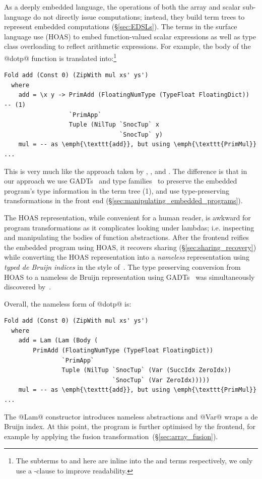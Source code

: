 As a deeply embedded language, the operations of both the array and scalar
sub-language do not directly issue computations; instead, they build term trees
to represent embedded computations (\S\ref{sec:EDSLs}). The terms in the surface
language use  (HOAS) to embed
function-valued scalar expressions as well as type class overloading to reflect
arithmetic expressions. For example, the body of the @dotp@ function
is translated into:\footnote{The subterms to  and 
here are inline into the  and  terms respectively,
we only use a -clause to improve readability.}
%
\begin{lstlisting}[style=haskell]
Fold add (Const 0) (ZipWith mul xs' ys')
  where
    add = \x y -> PrimAdd (FloatingNumType (TypeFloat FloatingDict))               -- (1)
                  `PrimApp`
                  Tuple (NilTup `SnocTup` x
                                `SnocTup` y)
    mul = -- as \emph{\texttt{add}}, but using \emph{\texttt{PrimMul}} ...
\end{lstlisting}
%
This is very much like the approach taken by \citet{Elliott:2004hh},
\citet{Gill:2011wy}, and \citet{Mainland:2010vj}. The difference is that in our
approach we use GADTs~\cite{Jones:2006eh} and type
families~\cite{Chakravarty:2005dx,Schrijvers:2008ir} to preserve the embedded
program's type information in the term tree (1), and use type-preserving
transformations in the front end (\S\ref{sec:manipulating_embedded_programs}).

The HOAS representation, while convenient for a human reader, is awkward
for program transformations as it complicates looking under lambdas; i.e.
inspecting and manipulating the bodies of function abstractions. After the
frontend reifies the embedded program using HOAS, it recovers sharing
(\S\ref{sec:sharing_recovery}) while converting the HOAS representation into a
\emph{nameless} representation using \emph{typed de Bruijn indices} in the style of~\citet{Altenkirch:2003kz}. The type preserving
conversion from HOAS to a nameless de Bruijn representation using
GADTs~\cite{Chakravarty:2009uo} was simultaneously discovered
by~\citet{Atkey:2009dj}.

Overall, the nameless form of @dotp@ is:
%
\begin{lstlisting}[style=haskell]
Fold add (Const 0) (ZipWith mul xs' ys')
  where
    add = Lam (Lam (Body (
        PrimAdd (FloatingNumType (TypeFloat FloatingDict))
                `PrimApp`
                Tuple (NilTup `SnocTup` (Var (SuccIdx ZeroIdx))
                              `SnocTup` (Var ZeroIdx)))))
    mul = -- as \emph{\texttt{add}}, but using \emph{\texttt{PrimMul}} ...
\end{lstlisting}
%
The @Lam@ constructor introduces nameless abstractions and @Var@ wraps a de
Bruijn index. At this point, the program is further optimised by the frontend,
for example by applying the fusion transformation~(\S\ref{sec:array_fusion}).

